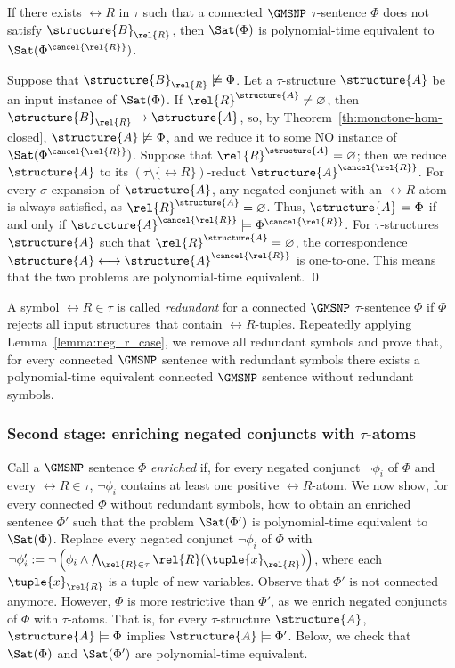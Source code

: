 \documentclass{lmcs}
\begin{document}
\begin{lem}\label{lemma:neg_r_case} 
If there exists $\rel{R}$ in $\tau$ such that a connected $\GMSNP$ $\tau$-sentence $\Phi$ does not satisfy $\structure{B}_\rel{R}$, then $\Sat(\Phi)$ is polynomial-time equivalent to $\Sat(\Phi^{\cancel{\rel{R}}})$.
\end{lem}
\proof
Suppose that $\structure{B}_\rel{R}\not\models\Phi$.
Let a $\tau$-structure $\structure{A}$ be an input instance of $\Sat(\Phi)$.
If $\rel{R}^\structure{A}\not=\varnothing$, then $\structure{B}_\rel{R}\to\structure{A}$, so, by Theorem~\ref{th:monotone-hom-closed}, $\structure{A}\not\models\Phi$, and we reduce it to some NO instance of $\Sat(\Phi^{\cancel{\rel{R}}})$.
Suppose that $\rel{R}^\structure{A}=\varnothing$; then we reduce $\structure{A}$ to its $(\tau\setminus\{\rel{R}\})$-reduct $\structure{A}^{\cancel{\rel{R}}}$. For every $\sigma$-expansion of $\structure{A}$, any negated conjunct with an $\rel{R}$-atom is always satisfied, as $\rel{R}^\structure{A}=\varnothing$.
Thus, $\structure{A}\models\Phi$ if and only if $\structure{A}^{\cancel{\rel{R}}}\models\Phi^{\cancel{\rel{R}}}$. For $\tau$-structures $\structure{A}$ such that $\rel{R}^\structure{A}=\varnothing$, the correspondence $\structure{A}\longleftrightarrow\structure{A}^{\cancel{\rel{R}}}$ is one-to-one.
This means that the two problems are polynomial-time equivalent.
\qed

A symbol $\rel{R}\in\tau$ is called \emph{redundant} for a connected $\GMSNP$ $\tau$-sentence $\Phi$ if $\Phi$ rejects all input structures that contain $\rel{R}$-tuples.
Repeatedly applying Lemma~\ref{lemma:neg_r_case}, we remove all redundant symbols and prove that, for every connected $\GMSNP$ sentence with  redundant symbols there exists a polynomial-time equivalent connected $\GMSNP$ sentence without redundant symbols.

\subsubsection*{Second stage: enriching negated conjuncts with $\tau$-atoms}\label{constr:non_empty}


Call a $\GMSNP$ sentence $\Phi$ \emph{enriched} if, for every negated conjunct $\neg\phi_i$ of $\Phi$ and every $\rel{R}\in\tau$, $\neg\phi_i$ contains at least one positive $\rel{R}$-atom.
We now show, for every connected $\Phi$ without redundant symbols, how to obtain an enriched sentence $\Phi'$ such that the problem $\Sat(\Phi')$ is polynomial-time equivalent to $\Sat(\Phi)$.
Replace every negated conjunct $\neg \phi_i$ of $\Phi$ with $\neg\phi_i' := \neg\left(\phi_i\wedge \bigwedge_{\rel{R}\in\tau}\rel{R}(\tuple{x}_\rel{R})\right)$, where each $\tuple{x}_\rel{R}$ is a tuple of new variables.
Observe that $\Phi'$ is not connected anymore.
However, $\Phi$ is more restrictive than $\Phi'$, as we enrich negated conjuncts of $\Phi$ with $\tau$-atoms.
That is, for every $\tau$-structure $\structure{A}$, $\structure{A}\models\Phi$ implies $\structure{A}\models\Phi'$.
Below, we check that $\Sat(\Phi)$ and $\Sat(\Phi')$ are polynomial-time equivalent.
\end{document}
